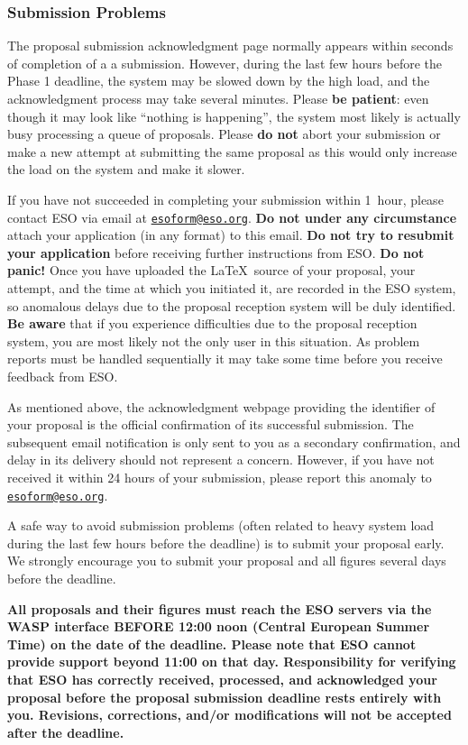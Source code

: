 \documentclass{article}
\begin{document}
\subsubsection*{Submission Problems} 
The proposal submission
acknowledgment page normally appears within seconds of completion of a
a submission. However, during the last few hours before the Phase 1
deadline, the system may be slowed down by the high load, and the
acknowledgment process may take several minutes. Please {\bf be
patient}: even though it may look like ``nothing is happening'', the
system most likely is actually busy processing a queue of
proposals. Please {\bf do not} abort your submission or make a new
attempt at submitting the same proposal as this would only increase the
load on the system and make it slower. 

If you have not succeeded in completing your submission within 1~hour, 
please contact ESO via email  
at \href{mailto:esoform@eso.org}{\tt esoform@eso.org}.
{\bf Do not under any circumstance} attach your application (in any
format) to this email. {\bf Do not try to resubmit your application}
before receiving further instructions from ESO. {\bf Do not panic!}
Once you have uploaded the \LaTeX\ source of your proposal, your
attempt, and the time at which you initiated it, are recorded in the
ESO system, so anomalous delays due to the proposal reception
system will be duly identified. {\bf Be aware} that if you experience
difficulties due to the proposal reception system, you are most likely 
not the only user in this situation. As problem reports must be
handled sequentially it may take some time before you receive
feedback from ESO.  

As mentioned above, the acknowledgment webpage providing the
identifier of your proposal is the official confirmation of its
successful submission. The subsequent email notification is only sent
to you as a secondary confirmation, and delay in its delivery should
not represent a concern. However, if you have not received
it within 24 hours of your submission, please report this anomaly to  
\href{mailto:esoform@eso.org}{\tt esoform@eso.org}. 

A safe way to avoid submission problems (often related to heavy
system load  during the last few hours before the deadline) is to submit your
proposal early.  We strongly encourage you to submit your
proposal and all figures several days before the deadline.
  
\vspace*{1cm} {\bf All proposals and their figures must reach the
  ESO servers via the WASP interface BEFORE 12:00 noon (Central
  European Summer Time) on the date of the deadline. Please note that  
  ESO cannot provide support beyond 11:00 on that day. 
  Responsibility for 
  verifying that ESO has correctly received, processed, and
  acknowledged your proposal before the proposal submission deadline
  rests entirely with you.  Revisions, corrections, and/or
  modifications will not be accepted after the deadline.}
\end{document}
